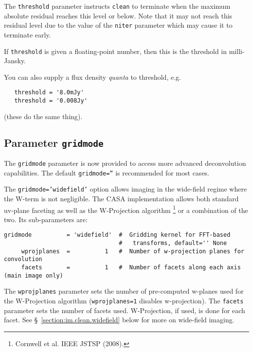 The {\tt threshold} parameter instructs {\tt clean} to terminate when
the maximum absolute residual reaches this level or below.  Note
that it may not reach this residual level due to the value of the
{\tt niter} parameter which may cause it to terminate early.

If {\tt threshold} is given a floating-point number, then this is the
threshold in milli-Jansky.

You can also supply a flux density {\em quanta} to threshold, e.g.
\small
\begin{verbatim}
   threshold = '8.0mJy'
   threshold = '0.008Jy'
\end{verbatim}
\normalsize
(these do the same thing).

\subsection{Parameter {\tt gridmode} }
\label{section:im.clean.gridmode}

The {\tt gridmode} parameter is now provided to access more
advanced deconvolution capabilities.  The default 
{\tt gridmode=''} is recommended for most cases.

The {\tt gridmode='widefield'} option allows imaging in the
wide-field regime where the W-term is not negligible.  The
CASA implementation allows both standard uv-plane faceting as
well as the W-Projection algorithm
\footnote{Cornwell et al. IEEE JSTSP (2008).}
or a combination of the two.  Its sub-parameters are:
\small
\begin{verbatim}
gridmode          = 'widefield'  #  Gridding kernel for FFT-based
                                 #   transforms, default='' None
     wprojplanes  =          1   #  Number of w-projection planes for convolution
     facets       =          1   #  Number of facets along each axis (main image only)
\end{verbatim}
\normalsize
The {\tt wprojplanes} parameter sets the number of pre-computed w-planes
used for the W-Projection algorithm ({\tt wprojplanes=1} disables
w-projection).  The {\tt facets} parameter sets the number of facets
used.  W-Projection, if used, is done for each facet.
See \S~\ref{section:im.clean.widefield} below for more on wide-field
imaging. 



